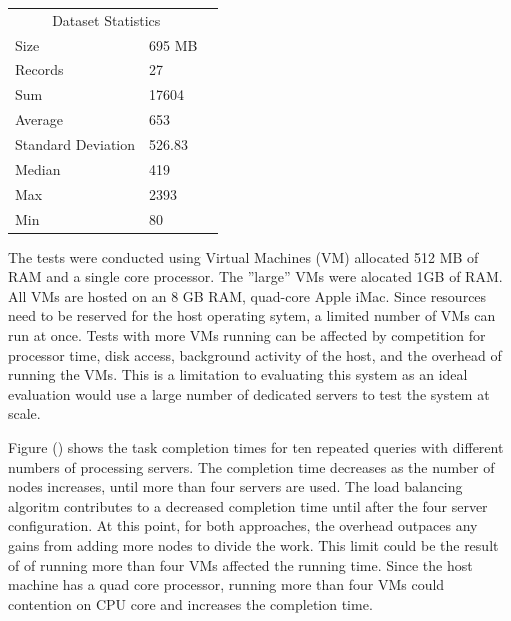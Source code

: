 \documentclass{article}
\begin{document}
\begin{multicols}{2}
\begin{tabular}{llr}
\hline
\multicolumn{2}{c}{Dataset Statistics} \\
\cline{1-2}
Size & 695 MB \\
Records & 27 \\
Sum & 17604 \\
Average & 653 \\ 
Standard Deviation & 526.83 \\
Median & 419 \\
Max & 2393 \\
Min & 80 \\
\hline
\end{tabular}


The tests were conducted using Virtual Machines (VM) allocated 512 MB of RAM and a single core processor. The ''large'' VMs were alocated 1GB of RAM.  All VMs are hosted on an 8 GB RAM, quad-core Apple iMac. Since resources need to be reserved for the host operating sytem, a limited number of VMs can run at once.  Tests with more VMs running can be affected by competition for processor time, disk access, background activity of the host, and the overhead of running the VMs.  This is a limitation to evaluating this system as an ideal evaluation would use a large number of dedicated servers to test the system at scale.

Figure () shows the task completion times for ten repeated queries with different numbers of processing servers.  The completion time decreases as the number of nodes increases, until more than four servers are used. The load balancing algoritm contributes to a decreased completion time until after the four server configuration.  At this point, for both approaches, the overhead outpaces any gains from adding more nodes to divide the work.  This limit could be the result of of running more than four VMs affected the running time.  Since the host machine has a quad core processor, running more than four VMs could contention on CPU core and increases the completion time.


\end{multicols}
\end{document}
